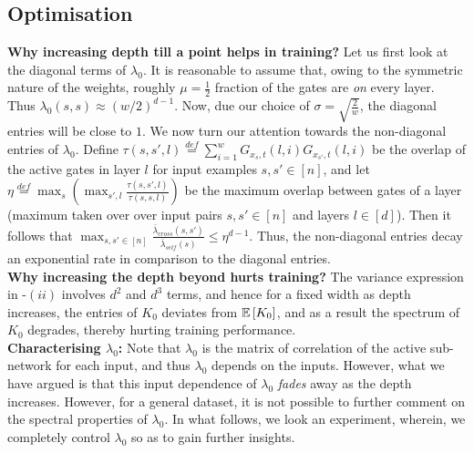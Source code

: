 \subsection{Optimisation}
\textbf{Why increasing depth till a point helps in training? } Let us first look at the diagonal terms of $\lambda_0$. It is reasonable to assume that, owing to the symmetric nature of the weights, roughly $\mu=\frac{1}{2}$ fraction of the gates are \emph{on} every layer. Thus $\lambda_0(s,s)\approx (w/2)^{d-1}$. Now, due our choice of $\sigma=\sqrt{\frac{2}{w}}$, the diagonal entries will be close to $1$. We now turn our attention towards the non-diagonal entries of $\lambda_0$. Define $\tau(s,s',l)\stackrel{def}=\sum_{i=1}^w G_{x_s,t}(l,i)G_{x_{s'},t}(l,i)$ be the overlap of the active gates in layer $l$ for input examples $s,s'\in[n]$, and  let $\eta\stackrel{def}=\max_s\left(\max_{s',l} \frac{\tau(s,s',l)}{\tau(s,s,l)}\right)$ be the maximum overlap between gates of a layer (maximum taken over over input pairs $s,s'\in[n]$ and layers $l\in [d]$).  Then it follows that $\max_{s,s'\in [n]} \frac{\bar{\lambda}_{cross}(s,s')}{\bar{\lambda}_{self}(s)}\leq \eta^{d-1}$. Thus, the non-diagonal entries decay an exponential rate in comparison to the diagonal entries.\hfill\\
\textbf{Why increasing the depth beyond hurts training?} The variance expression in -$(ii)$ involves $d^2$ and $d^3$ terms, and hence for a fixed width as depth increases, the entries of $K_0$ deviates from $\mathbb{E}\left[K_0\right]$, and as a result the spectrum of $K_0$ degrades, thereby hurting training performance.\\
\textbf{Characterising $\lambda_0$:} Note that $\lambda_0$ is the matrix of correlation of the active sub-network for each input, and thus $\lambda_0$ depends on the inputs. However, what we have argued is that this input dependence of $\lambda_0$ \emph{fades} away as the depth increases. However, for a general dataset, it is not possible to further comment on the spectral properties of $\lambda_0$. In what follows, we look an experiment, wherein, we completely control $\lambda_0$ so as to gain further insights.
